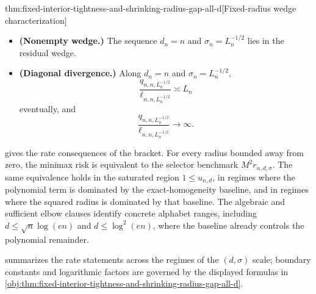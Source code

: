 \documentclass[11pt]{article}
\begin{document}
\begin{theoremv}{thm:fixed-interior-tightness-and-shrinking-radius-gap-all-d}[Fixed-radius wedge characterization]
\begin{itemize}
\[
\frac{r_{n,d_n,\sigma_n}}
{n^{-1}+\min\{1,d_n/n^2\}+\sigma_n^2\min\{1,u_{n,d_n}\}}
\to\infty,
\]
then the sequence lies in the residual wedge:
\[
\frac{b_{n,d_n}}{u_{n,d_n}}\to0,
\qquad
u_{n,d_n}\to0,
\qquad
\frac{b_{n,d_n}}{\sigma_n^2}\to0,
\qquad
\sigma_n^2\to0.
\]
\item \textbf{(Nonempty wedge.)} The sequence \(d_n=n\) and \(\sigma_n=L_n^{-1/2}\) lies in the residual wedge.
\item \textbf{(Diagonal divergence.)} Along \(d_n=n\) and \(\sigma_n=L_n^{-1/2}\),
\[
\frac{q_{n,n,L_n^{-1/2}}}{\ell_{n,n,L_n^{-1/2}}}
\asymp L_n
\]
eventually, and
\[
\frac{q_{n,n,L_n^{-1/2}}}{\ell_{n,n,L_n^{-1/2}}}\to\infty .
\]
\end{itemize}
\end{theoremv}

 gives the rate consequences of the bracket. For every radius bounded away from zero, the minimax risk is equivalent to the selector benchmark \(M^2r_{n,d,\sigma}\). The same equivalence holds in the saturated region \(1\le u_{n,d}\), in regimes where the polynomial term is dominated by the exact-homogeneity baseline, and in regimes where the squared radius is dominated by that baseline. The algebraic and sufficient elbow clauses identify concrete alphabet ranges, including \(d\le \sqrt n\log(en)\) and \(d\le \log^2(en)\), where the baseline already controls the polynomial remainder.

 summarizes the rate statements across the regimes of the \((d,\sigma)\) scale; boundary constants and logarithmic factors are governed by the displayed formulas in \cref{obj:thm:fixed-interior-tightness-and-shrinking-radius-gap-all-d}.
\end{document}
